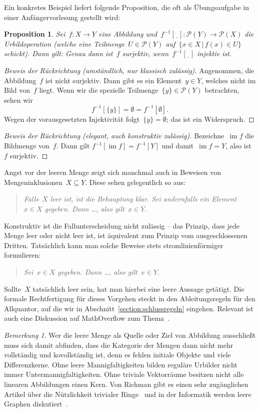 \documentclass[a4paper,ngerman,12pt]{scrartcl}
\theoremstyle{definition}
\theoremstyle{plain}
\newtheorem{prop}[defn]{Proposition}
\theoremstyle{remark}
\newtheorem{bem}[defn]{Bemerkung}
\renewcommand{\P}{\mathcal{P}}
\newcommand{\freist}{\underline{\ \ }}
\DeclareMathOperator{\im}{im}
\renewcommand{\_}{\mathpunct{.}\,}
\newcommand{\?}{\,{:}\,}
\begin{document}
Ein konkretes Beispiel liefert folgende Proposition, die oft als Übungsaufgabe in
einer Anfängervorlesung gestellt wird:
\begin{prop}Sei~$f : X \to Y$ eine Abbildung und~$f^{-1}[\freist] : \P(Y) \to
\P(X)$ die Urbildoperation (welche eine Teilmenge~$U \in \P(Y)$ auf~$\{ x \in X
\,|\, f(x) \in U \}$ schickt). Dann gilt: Genau dann ist~$f$ surjektiv,
wenn~$f^{-1}[\freist]$ injektiv ist.
\end{prop}
\begin{proof}[Beweis der Rückrichtung (umständlich, nur klassisch zulässig)]
Angenommen, die Abbildung~$f$ ist nicht surjektiv. Dann gibt es ein Element~$y \in
Y$, welches nicht im Bild von~$f$ liegt. Wenn wir die spezielle
Teilmenge~$\{y\} \in \P(Y)$ betrachten, sehen wir
\[ f^{-1}[\{y\}] = \emptyset = f^{-1}[\emptyset]. \]
Wegen der vorausgesetzten Injektivität folgt~$\{y\} = \emptyset$; das ist ein
Widerspruch.\end{proof}
\begin{proof}[Beweis der Rückrichtung (elegant, auch konstruktiv zulässig)]
Bezeichne~$\im f$ die Bildmenge von~$f$. Dann gilt
$f^{-1}[\im f] = f^{-1}[Y]$
und damit~$\im f = Y$, also ist~$f$ surjektiv.\end{proof}

Angst vor der leeren Menge zeigt sich manchmal auch in Beweisen von
Mengeninklusionen~$X \subseteq Y$. Diese sehen gelegentlich so aus:
\begin{quote}\emph{Falls~$X$ leer ist, ist die Behauptung klar. Sei andernfalls
ein Element~$x \in X$ gegeben. Dann \ldots, also gilt~$x \in Y$.}\end{quote}
Konstruktiv ist die Fallunterscheidung nicht zulässig -- das Prinzip, dass jede
Menge leer oder nicht leer ist, ist äquivalent zum Prinzip vom ausgeschlossenen
Dritten. Tatsächlich kann man solche Beweise stets stromlinienförmiger
formulieren:
\begin{quote}\emph{Sei~$x \in X$ gegeben. Dann \ldots, also gilt~$x \in
Y$.}\end{quote}
Sollte~$X$ tatsächlich leer sein, hat man hierbei eine leere Aussage getätigt.
Die formale Rechtfertigung für dieses Vorgehen steckt in den Ableitungsregeln
für den Allquantor, auf die wir in Abschnitt~\ref{section:schlussregeln}
eingehen. Relevant ist auch eine Diskussion auf MathOverflow zum
Thema~\cite{mathoverflow:emptyset}.

\begin{bem}Wer die leere Menge als Quelle oder Ziel von Abbildung ausschließt
muss sich damit abfinden, dass die Kategorie der Mengen dann nicht mehr
vollständig und kovollständig ist, denn es fehlen initiale Objekte und viele
Differenzkerne. Ohne leere Mannigfaltigkeiten bilden reguläre Urbilder nicht
immer Untermannigfaltigkeiten. Ohne triviale Vektorräume besitzen nicht alle
linearen Abbildungen einen Kern. Von Richman gibt es einen sehr zugänglichen Artikel
über die Nützlichkeit trivialer Ringe~\cite{richman:trivial-rings} und in der
Informatik werden leere Graphen diskutiert~\cite{empty-graph}.\end{bem}
\end{document}
